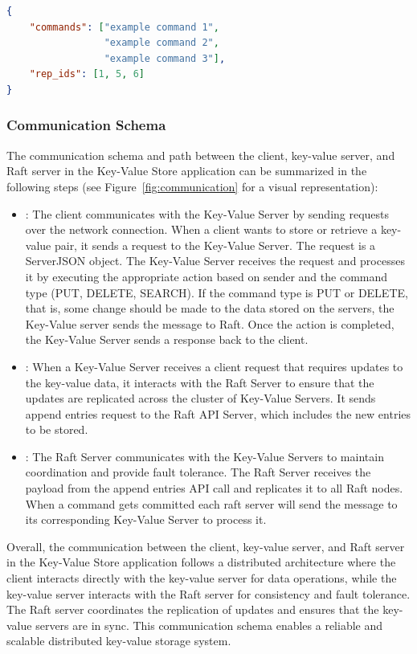 \documentclass{article}
\begin{document}
\begin{lstlisting}[language=json, caption={RaftJSON},label={lst:RaftJSON}]
{
    "commands": ["example command 1",
                 "example command 2",
                 "example command 3"],
    "rep_ids": [1, 5, 6]
}
\end{lstlisting}

\subsubsection{Communication Schema}
The communication schema and path between the client, key-value server, and Raft server in the
Key-Value Store application can be summarized in the following steps (see Figure~\ref{fig:communication} for a visual representation):
\begin{itemize}
    \item {}: The client communicates with the Key-Value Server
    by sending requests over the network connection. When a client wants to store or retrieve
    a key-value pair, it sends a request to the Key-Value Server. The request is a ServerJSON
    object. The Key-Value Server receives the request and processes it by executing the
    appropriate action based on sender and the command type (PUT, DELETE, SEARCH). If the
    command type is PUT or DELETE, that is, some change should be made to the data stored on
    the servers, the Key-Value server sends the message to Raft. Once the action is completed, 
    the Key-Value Server sends a response back to the client.
    \item {}: When a Key-Value Server
    receives a client request that requires updates to the key-value data, it interacts with
    the Raft Server to ensure that the updates are replicated across the cluster of Key-Value
    Servers. It sends append entries request to the Raft API Server, which includes the new entries
    to be stored.
    \item {}: The Raft Server communicates with the Key-Value
    Servers to maintain coordination and provide fault tolerance. The Raft Server receives the
    payload from the append entries API call and replicates it to all Raft nodes. When a command
    gets committed each raft server will send the message to its corresponding Key-Value Server 
    to process it.
\end{itemize}

Overall, the communication between the client, key-value server, and Raft server in the Key-Value
Store application follows a distributed architecture where the client interacts directly with the
key-value server for data operations, while the key-value server interacts with the Raft server
for consistency and fault tolerance. The Raft server coordinates the replication of updates and
ensures that the key-value servers are in sync. This communication schema enables a reliable and
scalable distributed key-value storage system.


%
%
\end{document}
